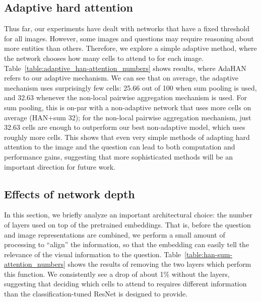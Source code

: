 \subsection{Adaptive hard attention}
Thus far, our experiments have dealt with networks that have a fixed threshold for all images.  
However, some images and questions may require reasoning about more entities than others.
Therefore, we explore a simple adaptive method, where the network chooses how many cells to attend to for each image.
Table~\ref{table:adaptive_han-attention_numbers} shows results, where AdaHAN refers to our adaptive mechanism.  We can see that on average, the adaptive mechanism uses surprisingly few cells: 25.66 out of 100 when sum pooling is used, and 32.63 whenever the non-local pairwise aggregation mechanism is used.
For sum pooling, this is on-par with a non-adaptive network that uses more cells on average (HAN+sum 32); for the non-local pairwise aggregation mechanism, just 32.63 cells are enough to outperform our best non-adaptive model, which uses roughly  more cells.
This shows that even very simple methods of adapting hard attention to the image and the question can lead to both computation and performance gains, suggesting that more sophisticated methods will be an important direction for future work.

\subsection{Effects of network depth}
In this section, we briefly analyze an important architectural choice: the number of layers used on top of the pretrained embeddings.  
That is, before the question and image representations are combined, we perform a small amount of processing to ``align'' the information, so that the embedding can easily tell the relevance of the visual information to the question.
Table~\ref{table:han-sum-attention_numbers} shows the results of removing the two layers which perform this function.  
We consistently see a drop of about 1\% without the layers, suggesting that deciding which cells to attend to requires different information than the classification-tuned ResNet is designed to provide.

